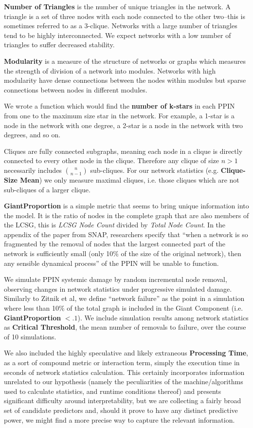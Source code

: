 \documentclass[12pt]{article}
\begin{document}
\textbf{Number of Triangles} is the number of unique triangles in the network. A triangle is a set of three nodes with each node connected to the other two--this is sometimes referred to as a 3-clique. Networks with a large number of triangles tend to be highly interconnected. We expect networks with a low number of triangles to suffer decreased stability.

\textbf{Modularity} is a measure of the structure of networks or graphs which measures the strength of division of a network into modules. Networks with high modularity have dense connections between the nodes within modules but sparse connections between nodes in different modules.

We wrote a function which would find the \textbf{number of k-stars} in each PPIN from one to the maximum size star in the network. For example, a 1-star is a node in the network with one degree, a 2-star is a node in the network with two degrees, and so on.

Cliques are fully connected subgraphs, meaning each node in a clique is directly connected to every other node in the clique. Therefore any clique of size $n>1$ necessarily includes ${n \choose n-1}$ sub-cliques. For our network statistics (e.g. \textbf{Clique-Size Mean}) we only measure maximal cliques, i.e. those cliques which are not sub-cliques of a larger clique.


\textbf{GiantProportion} is a simple metric that seems to bring unique information into the model. It is the ratio of nodes in the complete graph that are also members of the LCSG, this is \textit{LCSG Node Count} divided by \textit{Total Node Count}. In the appendix of the paper from SNAP, researchers specify that ``when a network is so fragmented by the removal of nodes that the largest connected part of the network is sufficiently small (only 10\% of the size of the original network), then any sensible dynamical process'' of the PPIN will be unable to function.

We simulate PPIN systemic damage by random incremental node removal, observing changes in network statistics under progressive simulated damage. Similarly to Zitnik et al, we define ``network failure'' as the point in a simulation where less than 10\% of the total graph is included in the Giant Component (i.e. \textbf{GiantProportion} $<.1$). We include simulation results among network statistics as \textbf{Critical Threshold}, the mean number of removals to failure, over the course of 10 simulations.

We also included the highly speculative and likely extraneous \textbf{Processing Time}, as a sort of compound metric or interaction term, simply the execution time in seconds of network statistics calculation. This certainly incorporates information unrelated to our hypothesis (namely the peculiarities of the machine/algorithms used to calculate statistics, and runtime conditions thereof) and presents significant difficulty around interpretability, but we are collecting a fairly broad set of candidate predictors and, should it prove to have any distinct predictive power, we might find a more precise way to capture the relevant information.
\end{document}
